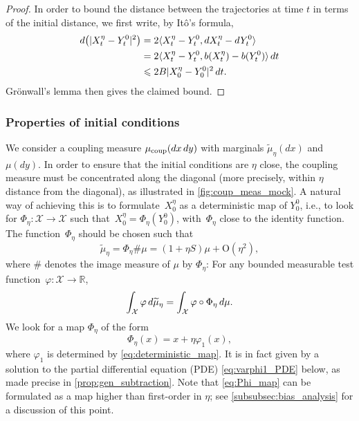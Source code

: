 \documentclass[11pt]{article}
\newcommand{\R}{\mathbb{R}}
\newcommand{\X}{\mathcal{X}}
\newcommand{\bigO}{\mathrm{O}}
\renewcommand{\leq}{\leqslant}
\DeclarePairedDelimiter\ip{\langle}{\rangle}
\theoremstyle{definition}
\newcommand{\psip}{\widetilde{\mu}_\eta}
\newcommand{\mucoup}{\mu_{\rm coup}}
\begin{document}
\begin{proof}In order to bound the distance between the trajectories at time $t$ in terms of the initial distance, we first write, by It\^o's formula,
\begin{align*}
		d\bigl(|X_t^\eta - Y_t^0|^2\bigr) &= 2\ip{X_t^\eta - Y_t^0, dX_t^\eta - dY^0_t} \\
		&= 2\langle X_t^\eta - Y_t^0, b(X_t^\eta) - b(Y_t^0)\rangle \, dt \\
		&\leq 2B|X_0^\eta - Y_0^0|^2 \, dt.
	\end{align*}
Gr\"onwall's lemma then gives the claimed bound. \end{proof}

\subsubsection{Properties of initial conditions}
\label{subsubsec:properties_init_cond}
We consider a coupling measure $\mucoup(dx \, dy)$ with marginals $\psip(dx)$ and $\mu(dy)$. In order to ensure that the initial conditions are $\eta$ close, the coupling measure must be concentrated along the diagonal (more precisely, within $\eta$ distance from the diagonal), as illustrated in \cref{fig:coup_meas_mock}. A natural way of achieving this is to formulate~$X_0^\eta$ as a deterministic map of $Y_0^0$, i.e., to look for $\Phi_\eta \colon \mathcal{X} \to \mathcal{X}$ such that~$X_0^\eta = \Phi_\eta(Y_0^0)$, with~$\Phi_\eta$ close to the identity function. The function~$\Phi_\eta$ should be chosen such that
\begin{equation}
	\psip = \Phi_\eta \# \mu = (1+\eta S)\mu + \bigO(\eta^2),
	\label{eq:deterministic_map}
\end{equation}
where $\#$ denotes the image measure of $\mu$ by $\Phi_\eta$: For any bounded measurable test function~$\varphi\colon \X \to \R$,
\begin{equation}
    \notag
	\int_\mathcal{X} \varphi \, d\psip = \int_\mathcal{X} \varphi \circ \Phi_\eta \, d\mu.
\end{equation}
We look for a map $\Phi_\eta$ of the form
\begin{equation}
	\Phi_\eta(x) = x + \eta\varphi_1(x),
	\label{eq:Phi_map}
\end{equation}
where $\varphi_1$ is determined by \eqref{eq:deterministic_map}. It is in fact given by a solution to the partial differential equation (PDE) \eqref{eq:varphi1_PDE} below, as made precise in \cref{prop:gen_subtraction}.
Note that \eqref{eq:Phi_map} can be formulated as a map higher than first-order in $\eta$; see \cref{subsubsec:bias_analysis} for a discussion of this point.
\end{document}
